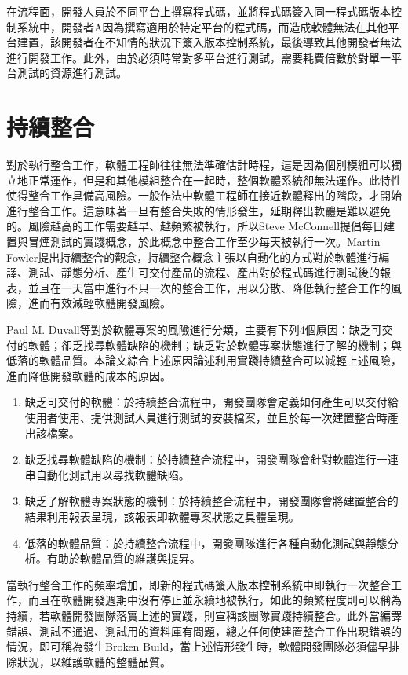 在流程面，開發人員於不同平台上撰寫程式碼，並將程式碼簽入同一程式碼版本控制系統中，開發者A因為撰寫適用於特定平台的程式碼，而造成軟體無法在其他平台建置，該開發者在不知情的狀況下簽入版本控制系統，最後導致其他開發者無法進行開發工作。此外，由於必須時常對多平台進行測試，需要耗費倍數於對單一平台測試的資源進行測試\cite{netscapecrossplatform}。

\section{持續整合}

對於執行整合工作，軟體工程師往往無法準確估計時程，這是因為個別模組可以獨立地正常運作，但是和其他模組整合在一起時，整個軟體系統卻無法運作。此特性使得整合工作具備高風險。一般作法中軟體工程師在接近軟體釋出的階段，才開始進行整合工作。這意味著一旦有整合失敗的情形發生，延期釋出軟體是難以避免的。風險越高的工作需要越早、越頻繁被執行，所以Steve McConnell\cite{rapiddevelopment}提倡每日建置與冒煙測試的實踐概念，於此概念中整合工作至少每天被執行一次。Martin Fowler提出持續整合的觀念\cite{martinfowlerci}，持續整合概念主張以自動化的方式對於軟體進行編譯、測試、靜態分析、產生可交付產品的流程、產出對於程式碼進行測試後的報表，並且在一天當中進行不只一次的整合工作，用以分散、降低執行整合工作的風險，進而有效減輕軟體開發風險。

Paul M. Duvall等對於軟體專案的風險進行分類，主要有下列4個原因：缺乏可交付的軟體；卻乏找尋軟體缺陷的機制；缺乏對於軟體專案狀態進行了解的機制；與低落的軟體品質\cite{continuousintegration2007}。本論文綜合上述原因論述利用實踐持續整合可以減輕上述風險，進而降低開發軟體的成本的原因。
\begin{enumerate}
\item 缺乏可交付的軟體：於持續整合流程中，開發團隊會定義如何產生可以交付給使用者使用、提供測試人員進行測試的安裝檔案，並且於每一次建置整合時產出該檔案。
\item 缺乏找尋軟體缺陷的機制：於持續整合流程中，開發團隊會針對軟體進行一連串自動化測試用以尋找軟體缺陷。
\item 缺乏了解軟體專案狀態的機制：於持續整合流程中，開發團隊會將建置整合的結果利用報表呈現，該報表即軟體專案狀態之具體呈現。
\item 低落的軟體品質：於持續整合流程中，開發團隊進行各種自動化測試與靜態分析。有助於軟體品質的維護與提昇。
\end{enumerate}

當執行整合工作的頻率增加，即新的程式碼簽入版本控制系統中即執行一次整合工作，而且在軟體開發週期中沒有停止並永續地被執行，如此的頻繁程度則可以稱為持續，若軟體開發團隊落實上述的實踐，則宣稱該團隊實踐持續整合。此外當編譯錯誤、測試不通過、測試用的資料庫有問題，總之任何使建置整合工作出現錯誤的情況，即可稱為發生Broken Build，當上述情形發生時，軟體開發團隊必須儘早排除狀況，以維護軟體的整體品質。

